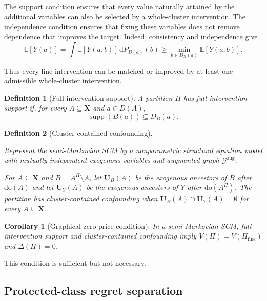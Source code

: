 \documentclass[twoside]{article}
\newtheorem{definition}{Definition}
\newtheorem{corollary}{Corollary}
\newcommand{\E}{\mathbb{E}}
\newcommand{\doo}{\mathrm{do}}
\newcommand{\Gg}{\mathcal{G}}
\begin{document}
The support condition ensures that every value naturally attained by the additional variables can also be selected by a whole-cluster intervention. The independence condition ensures that fixing these variables does not remove dependence that improves the target. Indeed, consistency and independence give
\[
  \E[Y(a)]
  =
  \int \E[Y(a,b)]\,\mathrm dP_{B(a)}(b)
  \ge
  \min_{b\in D_B(a)}\E[Y(a,b)].
\]

Thus every fine intervention can be matched or improved by at least one admissible whole-cluster intervention.

\begin{definition}[Full intervention support]
\label{def:full-support}
A partition $\Pi$ has full intervention support if, for every
$A\subseteq\mathbf X$ and $a\in D(A)$,
\[
\operatorname{supp}(B(a))\subseteq D_B(a).
\]
\end{definition}

\begin{definition}[Cluster-contained confounding]
\label{def:ccc}

Represent the semi-Markovian SCM by a nonparametric structural equation model with mutually independent exogenous variables and augmented graph $\Gg^{\mathrm{aug}}$.

 
For $A\subseteq\mathbf X$ and $B=A^\Pi\setminus A$, let $\mathbf U_B(A)$ be the exogenous ancestors of $B$ after $\doo(A)$ and let $\mathbf U_Y(A)$ be the exogenous ancestors of $Y$ after $\doo(A^\Pi)$. The partition has cluster-contained confounding when $\mathbf U_B(A)\cap\mathbf U_Y(A)=\emptyset$ for every $A\subseteq\mathbf X$.
\end{definition}

\begin{corollary}[Graphical zero-price condition]
\label{cor:zero-price}
In a semi-Markovian SCM, full intervention support and cluster-contained confounding imply $V(\Pi)=V(\Pi_{\mathrm{fine}})$ and $\Delta(\Pi)=0$.
\end{corollary}

This condition is sufficient but not necessary. 

\subsection{Protected-class regret separation}
\label{sec:separation}
\end{document}
